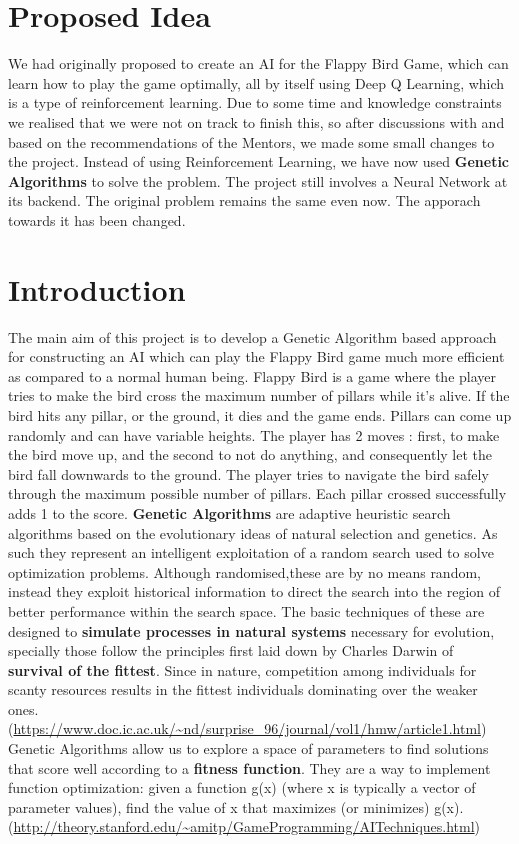 \documentclass{article}
\begin{document}
\section{Proposed Idea}
We had originally proposed to create an AI for the Flappy Bird Game, which can learn how to play the game optimally, all by itself using Deep Q Learning, which is a type of reinforcement learning. Due to some time and knowledge constraints we realised that we were not on track to finish this, so after discussions with and based on the recommendations of the Mentors, we made some small changes to the project. Instead of using Reinforcement Learning, we have now used \textbf{Genetic Algorithms} to solve the problem. The project still involves a Neural Network at its backend. The original problem remains the same even now. The apporach towards it has been changed.   

\section{Introduction}	

The main aim of this project is to develop a Genetic Algorithm based approach for constructing an AI which can play the Flappy Bird game much more efficient as compared to a normal human being.
\hfill \break
\hfill \break
Flappy Bird is a game where the player tries to make the bird cross the maximum number of pillars while it's alive. If the bird hits any pillar, or the ground, it dies and the game ends. Pillars can come up randomly and can have variable heights. The player has 2 moves : first, to make the bird move up, and the second to not do anything, and consequently let the bird fall downwards to the ground. The player tries to navigate the bird safely through the maximum possible number of pillars. Each pillar crossed successfully adds 1 to the score.
\hfill \break
\hfill \break
\textbf{Genetic Algorithms} are adaptive heuristic search algorithms based on the evolutionary ideas of natural selection and genetics. As such they represent an intelligent exploitation of a random search used to solve optimization problems. Although randomised,these are by no means random, instead they exploit historical information to direct the search into the region of better performance within the search space. The basic techniques of these are designed to \textbf{simulate processes in natural systems} necessary for evolution, specially those follow the principles first laid down by Charles Darwin of \textbf{survival of the fittest}. Since in nature, competition among individuals for scanty resources results in the fittest individuals dominating over the weaker ones.(\url{https://www.doc.ic.ac.uk/~nd/surprise_96/journal/vol1/hmw/article1.html})
\hfill \break
\hfill \break
Genetic Algorithms allow us to explore a space of parameters to find solutions that score well according to a \textbf{fitness function}. They are a way to implement function optimization: given a function g(x) (where x is typically a vector of parameter values), find the value of x that maximizes (or minimizes) g(x).(\url{http://theory.stanford.edu/~amitp/GameProgramming/AITechniques.html})
\end{document}
